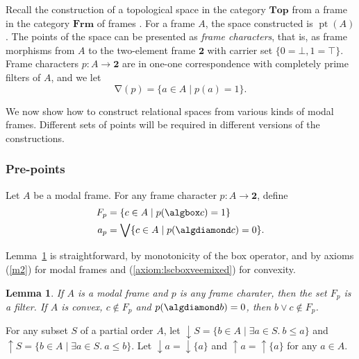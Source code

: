\documentclass{article}[a4paper]
\newtheorem{lemma}{Lemma}%
\theoremstyle{definition}
\newcommand{\topcat}{\mathbf{Top}}
\newcommand{\frm}{\mathbf{Frm}}
\newcommand{\twobb}{\mathbf{2}}
\DeclareMathOperator{\pt}{\mathrm{pt}}
\DeclareMathOperator{\charop}{\nabla}
\DeclareMathOperator{\downset}{\downarrow}
\DeclareMathOperator{\upset}{\uparrow}
\begin{document}
Recall the construction of a topological space in the category $\topcat$ from a frame in the category $\frm$ of frames \cite{stonespaces}. For a frame $A$, the space constructed is $\pt{(A)}$. The points of the space can be presented as \emph{frame characters}, that is, as frame morphisms from $A$ to the two-element frame $\twobb$ with carrier set $\{0=\bot , 1 = \top \}$. Frame characters $p:A \longrightarrow \twobb$ are in one-one correspondence with completely prime filters of $A$, and we let 
\begin{equation*}
    \charop(p) = \{ a \in A \mid p(a)=1 \} .
\end{equation*}

We now show how to construct relational spaces from various kinds of modal frames. Different sets of points will be required in different versions of the constructions. 

\subsubsection{Pre-points}

Let $A$ be a modal frame. For any frame character $p:A \longrightarrow \twobb$, define 
\begin{align}
    \label{canonicalFilter}
    F_p & = \{ c \in A \mid p (\algbox c)=1\} \\ 
    \label{canonicalElement}
     a_p & = \bigvee \{ c \in A \mid p(\algdiamond c)=0 \} .
\end{align}

Lemma~\ref{result:FpFilter} is straightforward, by monotonicity of the box operator, and by axioms (\ref{m2}) for modal frames and (\ref{axiom:lscboxveemixed}) for convexity.

\begin{lemma}
\label{result:FpFilter}
If $A$ is a modal frame and $p$ is any frame charater, then the set $F_p$ is a filter. If $A$ is convex, $c \notin F_p$ and $p(\algdiamond b) = 0$, then $b \vee c \notin F_p$.
\end{lemma}

For any subset $S$ of a partial order $A$, let 
$\downset S = \{ b \in A \mid \exists a \in S. \ b \leq a \}$ 
and 
$\upset S = \{ b \in A \mid \exists a \in S. \ a \leq b \}$.  Let 
$\downset a = \downset \{ a \}$ and 
$\upset a = \upset \{ a \}$ 
for any $a \in A$.
\end{document}
